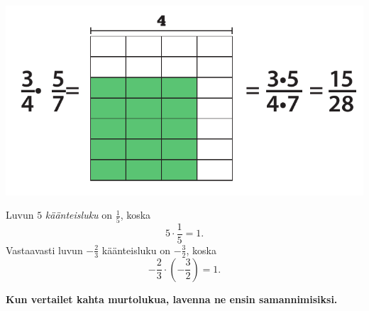 \includegraphics[scale=0.4]{pictures/Kuva3-1-5.pdf}

\begin{esimerkki}
	Luvun $5$ \emph{käänteisluku} on $\frac{1}{5}$, koska
	\[
	 5\cdot \frac{1}{5}=1.
	\]
	Vastaavasti luvun $-\frac{2}{3}$ käänteisluku on $-\frac{3}{2}$, koska
	\[
	 -\frac{2}{3}\cdot (-\frac{3}{2})=1.
	\]

\end{esimerkki}
    \textbf{Kun vertailet kahta murtolukua, lavenna ne ensin samannimisiksi.}
    
